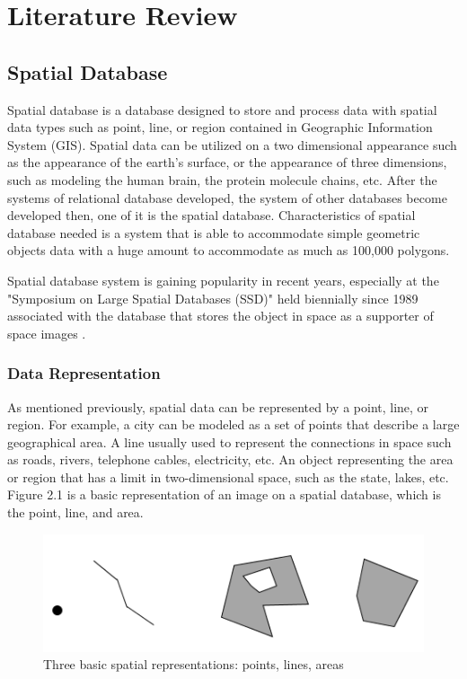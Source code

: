 \chapter{Literature Review}

\section{Spatial Database}
Spatial database is a database designed to store and process data with spatial data types such as point, line, or region contained in Geographic Information System (GIS). Spatial data can be utilized on a two dimensional appearance such as the appearance of the earth's surface, or the appearance of three dimensions, such as modeling the human brain, the protein molecule chains, etc. After the systems of relational database developed, the system of other databases become developed then, one of it is the spatial database. Characteristics of spatial database needed is a system that is able to accommodate simple geometric objects data with a huge amount to accommodate as much as 100,000 polygons.

Spatial database system is gaining popularity in recent years, especially at the "Symposium on Large Spatial Databases (SSD)" held biennially since 1989 associated with the database that stores the object in space as a supporter of space images \cite{okabe2009spatial}.
\subsection{Data Representation}
As mentioned previously, spatial data can be represented by a point, line, or region. For example, a city can be modeled as a set of points that describe a large geographical area. A line usually used to represent the connections in space such as roads, rivers, telephone cables, electricity, etc. An object representing the area or region that has a limit in two-dimensional space, such as the state, lakes, etc. Figure 2.1 is a basic representation of an image on a spatial database, which is the point, line, and area.
\begin{figure}[h!]
	\centering
	\includegraphics[scale=0.5]{figure1.png}
	\caption{Three basic spatial representations: points, lines, areas}
	\label{fig:figure1}
\end{figure}

